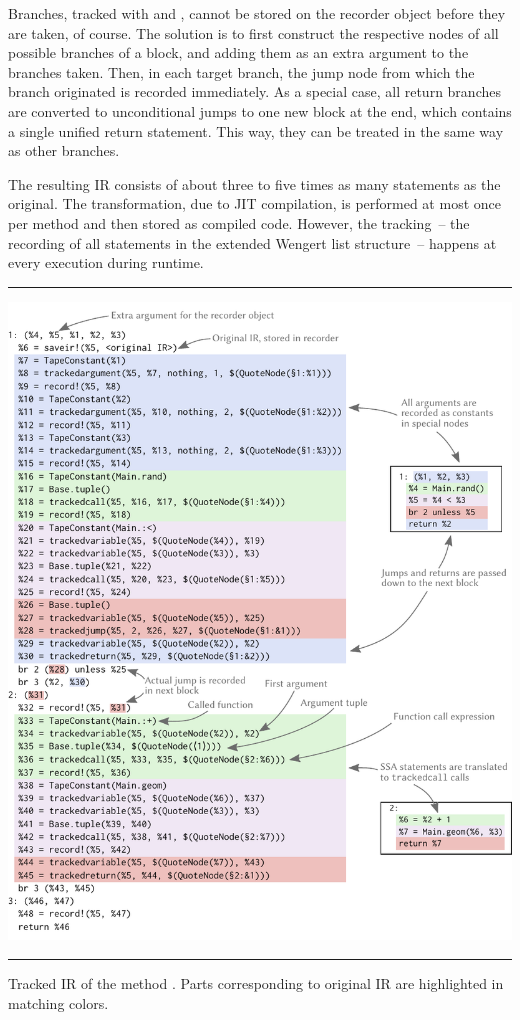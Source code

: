 Branches, tracked with  and , cannot be stored on the
recorder object before they are taken, of course.  The solution is to first construct the respective
nodes of all possible branches of a block, and adding them as an extra argument to the branches
taken.  Then, in each target branch, the jump node from which the branch originated is recorded
immediately.  As a special case, all return branches are converted to unconditional jumps to one new
block at the end, which contains a single unified return statement.  This way, they can be treated
in the same way as other branches.

The resulting IR consists of about three to five times as many statements as the original.  The
transformation, due to JIT compilation, is performed at most once per method and then stored as
compiled code.  However, the tracking~-- the recording of all statements in the extended Wengert
list structure~-- happens at every execution during runtime.

\begin{lstfloat}[p]
  \hrule
  \includegraphics[width=\textwidth]{figures/translation}
  \hrule
  \caption{Tracked IR of the method \protect{}.  Parts corresponding to
    original IR are highlighted in matching colors.}
  \label{lst:geom-tracked}
\end{lstfloat}

